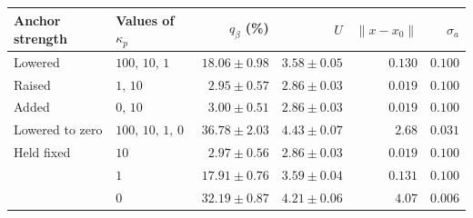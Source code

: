 \begin{tabular}{llrrrr}
\toprule
Anchor strength & Values of $\kappa_p$ & $q_\beta$ (\%) & $U$ & $\|x-x_0\|$ & $\sigma_a$ \\
\midrule
Lowered & $100,\,10,\,1$ & $18.06\pm0.98$ & $3.58\pm0.05$ & $0.130$ & $0.100$ \\
Raised & $1,\,10$ & $2.95\pm0.57$ & $2.86\pm0.03$ & $0.019$ & $0.100$ \\
Added & $0,\,10$ & $3.00\pm0.51$ & $2.86\pm0.03$ & $0.019$ & $0.100$ \\
Lowered to zero & $100,\,10,\,1,\,0$ & $36.78\pm2.03$ & $4.43\pm0.07$ & $2.68$ & $0.031$ \\
\addlinespace
Held fixed & $10$ & $2.97\pm0.56$ & $2.86\pm0.03$ & $0.019$ & $0.100$ \\
 & $1$ & $17.91\pm0.76$ & $3.59\pm0.04$ & $0.131$ & $0.100$ \\
 & $0$ & $32.19\pm0.87$ & $4.21\pm0.06$ & $4.07$ & $0.006$ \\
\bottomrule
\end{tabular}
